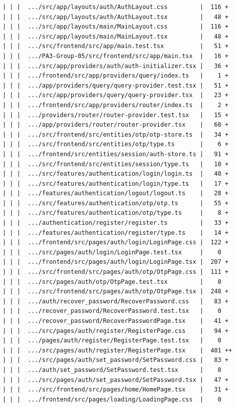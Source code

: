\documentclass[12pt]{article}
\begin{document}
\begin{lstlisting}[numbers=none,breaklines=true]
| | |  .../src/app/layouts/auth/AuthLayout.css         |  116 +
| | |  .../src/app/layouts/auth/AuthLayout.tsx         |   48 +
| | |  .../src/app/layouts/main/MainLayout.css         |  116 +
| | |  .../src/app/layouts/main/MainLayout.tsx         |   48 +
| | |  .../src/frontend/src/app/main.test.tsx          |   51 +
| | |  .../PA3-Group-05/src/frontend/src/app/main.tsx  |   16 +
| | |  .../src/app/providers/auth/auth-initializer.tsx |   36 +
| | |  .../frontend/src/app/providers/query/index.ts   |    1 +
| | |  .../app/providers/query/query-provider.test.tsx |   51 +
| | |  .../src/app/providers/query/query-provider.tsx  |   23 +
| | |  .../frontend/src/app/providers/router/index.ts  |    2 +
| | |  .../providers/router/router-provider.test.tsx   |   15 +
| | |  .../app/providers/router/router-provider.tsx    |   60 +
| | |  .../src/frontend/src/entities/otp/otp-store.ts  |   34 +
| | |  .../src/frontend/src/entities/otp/type.ts       |    6 +
| | |  .../frontend/src/entities/session/auth-store.ts |   91 +
| | |  .../src/frontend/src/entities/session/type.ts   |   10 +
| | |  .../src/features/authentication/login/login.ts  |   40 +
| | |  .../src/features/authentication/login/type.ts   |   17 +
| | |  .../features/authentication/logout/logout.ts    |   28 +
| | |  .../src/features/authentication/otp/otp.ts      |   55 +
| | |  .../src/features/authentication/otp/type.ts     |    8 +
| | |  .../authentication/register/register.ts         |   33 +
| | |  .../features/authentication/register/type.ts    |   14 +
| | |  .../frontend/src/pages/auth/login/LoginPage.css |  122 +
| | |  .../src/pages/auth/login/LoginPage.test.tsx     |    0
| | |  .../frontend/src/pages/auth/login/LoginPage.tsx |  207 +
| | |  .../src/frontend/src/pages/auth/otp/OtpPage.css |  111 +
| | |  .../src/pages/auth/otp/OtpPage.test.tsx         |    0
| | |  .../src/frontend/src/pages/auth/otp/OtpPage.tsx |  248 +
| | |  .../auth/recover_password/RecoverPassword.css   |   83 +
| | |  .../recover_password/RecoverPassword.test.tsx   |    0
| | |  .../recover_password/RecoverPasswordPage.tsx    |   41 +
| | |  .../src/pages/auth/register/RegisterPage.css    |   94 +
| | |  .../pages/auth/register/RegisterPage.test.tsx   |    0
| | |  .../src/pages/auth/register/RegisterPage.tsx    |  401 ++
| | |  .../src/pages/auth/set_password/SetPassword.css |   83 +
| | |  .../auth/set_password/SetPassword.test.tsx      |    0
| | |  .../src/pages/auth/set_password/SetPassword.tsx |   47 +
| | |  .../src/frontend/src/pages/home/HomePage.tsx    |   31 +
| | |  .../frontend/src/pages/loading/LoadingPage.css  |    0

\end{lstlisting}
\end{document}

